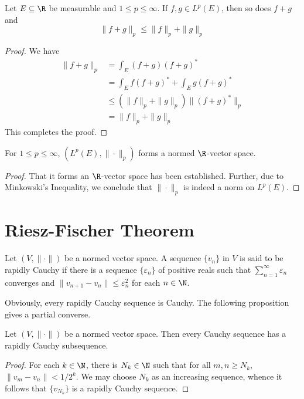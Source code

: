 \begin{theorem}[Minkowski]
    Let $E\subseteq\R$ be measurable and $1\le p\le\infty$. If $f,g\in L^p(E)$, then so does $f + g$ and 
    \begin{equation*}
        \|f + g\|_p\le\|f\|_p + \|g\|_p
    \end{equation*}
\end{theorem}
\begin{proof}
    We have 
    \begin{align*}
        \|f + g\|_p &= \int_E(f + g)(f + g)^*\\
        &= \int_E f(f + g)^* + \int_E g(f + g)^*\\
        &\le\left(\|f\|_p + \|g\|_p\right)\|(f + g)^*\|_p\\
        &= \|f\|_p + \|g\|_p
    \end{align*}
    This completes the proof.
\end{proof}

\begin{theorem}
    For $1\le p\le\infty$, $\left(L^p(E), \|\cdot\|_p\right)$ forms a normed $\R$-vector space.
\end{theorem}
\begin{proof}
    That it forms an $\R$-vector space has been established. Further, due to Minkowski's Inequality, we conclude that $\|\cdot\|_p$ is indeed a norm on $L^p(E)$.
\end{proof}

\section{Riesz-Fischer Theorem}

\begin{definition}
    Let $(V,\|\cdot\|)$ be a normed vector space. A sequence $\{v_n\}$ in $V$ is said to be rapidly Cauchy if there is a sequence $\{\varepsilon_n\}$ of positive reals such that $\sum\limits_{n = 1}^\infty\varepsilon_n$ converges and $\|v_{n + 1} - v_n\|\le\varepsilon_n^2$ for each $n\in\N$.
\end{definition}

Obviously, every rapidly Cauchy sequence is Cauchy. The following proposition gives a partial converse.

\begin{proposition}
    Let $(V,\|\cdot\|)$ be a normed vector space. Then every Cauchy sequence has a rapidly Cauchy subsequence.
\end{proposition}
\begin{proof}
    For each $k\in\N$, there is $N_k\in\N$ such that for all $m,n\ge N_k$, $\|v_m - v_n\| < 1/2^k$. We may choose $N_k$ as an increasing sequence, whence it follows that $\{v_{N_k}\}$ is a rapidly Cauchy sequence.
\end{proof}

